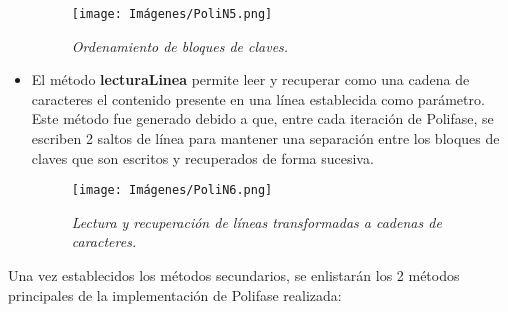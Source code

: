 \documentclass[letterpaper,12pt]{extarticle}
\begin{document}
\begin{itemize}
\begin{figure}[h!]
\centering
\texttt{[image: Imágenes/PoliN5.png]}
\caption{\textit{Ordenamiento de bloques de claves.}}
\label{fig:PoliN5}
\end{figure}


\item El método \textbf{lecturaLinea} permite leer y recuperar como una cadena de caracteres el contenido presente en una línea establecida como parámetro. Este método fue generado debido a que, entre cada iteración de Polifase, se escriben 2 saltos de línea para mantener una separación entre los bloques de claves que son escritos y recuperados de forma sucesiva. 

\begin{figure}[h!]
\centering
\texttt{[image: Imágenes/PoliN6.png]}
\caption{\textit{Lectura y recuperación de líneas transformadas a cadenas de caracteres.}}
\label{fig:PoliN6}
\end{figure}

\end{itemize}

\pagebreak

Una vez establecidos los métodos secundarios, se enlistarán los 2 métodos principales de la implementación de Polifase realizada: 
\end{document}
